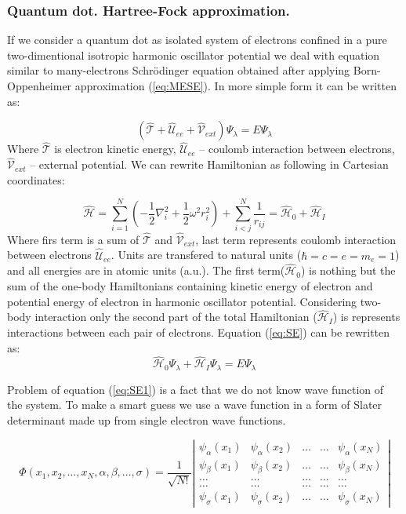 \documentclass[10pt]{article}
\newcommand*{\hatH}{\hat{\mathcal{H}}}
\newcommand*{\hatT}{\hat{\mathcal{T}}}
\newcommand*{\hatU}{\hat{\mathcal{U}}}
\newcommand*{\hatV}{\hat{\mathcal{V}}}
\begin{document}
\subsubsection{Quantum dot. Hartree-Fock approximation.} 
If we consider a quantum dot as isolated system of electrons confined in a pure two-dimentional isotropic harmonic oscillator potential we deal with equation similar to many-electrons Schr\"{o}dinger equation obtained after applying Born-Oppenheimer approximation (\ref{eq:MESE}).
In more simple form it can be written as:

\begin{equation}\label{eq:SE}
(\hatT + \hatU_{ee} + \hatV_{ext}) \Psi_{\lambda} = E \Psi_{\lambda}
\end{equation}
Where $\hatT$ is electron kinetic energy, $\hatU_{ee}$ -- coulomb interaction between electrons, $\hatV_{ext}$ -- external potential. We can rewrite Hamiltonian as following in Cartesian coordinates:

\[
\hatH = \sum_{i=1}^{N} \left(  -\frac{1}{2} \nabla_i^2 + \frac{1}{2} \omega^2r_i^2  \right)+\sum_{i<j}^{N}\frac{1}{r_{ij}} = \hatH_0 + \hatH_I
\]
Where firs term is a sum of $\hatT$ and $\hatV_{ext}$, last term represents coulomb interaction between electrons $\hatU_{ee}$. Units are transfered to natural units ($\hbar=c=e=m_e=1$) and all energies are in atomic units (a.u.). The first term($\hatH_0$) is nothing but the sum of the one-body Hamiltonians containing kinetic energy of electron and potential energy of electron in harmonic oscillator potential. Considering two-body interaction only the second part of the total Hamiltonian ($\hatH_I$) is represents interactions between each pair of electrons. Equation (\ref{eq:SE}) can be rewritten as: 
\begin{equation}\label{eq:SE1}
\hatH_0 \Psi_{\lambda} + \hatH_I \Psi_{\lambda} = E \Psi_{\lambda}
\end{equation}

Problem of equation (\ref{eq:SE1}) is a fact that we do not know wave function of the system. To make a smart guess we use a wave function in a form of Slater determinant made up from single electron wave functions. 

\begin{equation}
\Phi(x_1, x_2,\dots ,x_N,\alpha,\beta,\dots, \sigma)=\frac{1}{\sqrt{N!}}
\left| \begin{array}{ccccc} \psi_{\alpha}(x_1)& \psi_{\alpha}(x_2)& \dots & \dots & \psi_{\alpha}(x_N)\\
                            \psi_{\beta}(x_1)&\psi_{\beta}(x_2)& \dots & \dots & \psi_{\beta}(x_N)\\  
                            \dots & \dots & \dots & \dots & \dots \\
                            \dots & \dots & \dots & \dots & \dots \\
                     \psi_{\sigma}(x_1)&\psi_{\sigma}(x_2)& \dots & \dots & \psi_{\sigma}(x_N)\end{array} \right| \label{eq:HartreeFockDet}
\end{equation}
\end{document}
